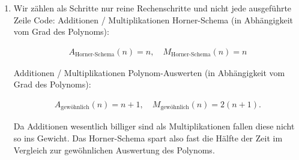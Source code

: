 \begin{solution}
\begin{enumerate}[label = (\roman*)]
  \item Wir zählen als Schritte nur reine Rechenschritte und nicht jede ausgeführte Zeile Code:
  Additionen / Multiplikationen Horner-Schema (in Abhängigkeit vom Grad des Polynoms):
  
  \begin{align*}
    A_{\text{Horner-Schema}}(n) = n,
    \quad
    M_{\text{Horner-Schema}}(n) = n
  \end{align*}

  Additionen / Multiplikationen Polynom-Auswerten (in Abhängigkeit vom Grad des Polynoms):

  \begin{align*}
    A_{\text{gewöhnlich}}(n) = n + 1,
    \quad
    M_{\text{gewöhnlich}}(n) = 2 (n + 1).
  \end{align*}

  Da Additionen wesentlich billiger sind als Multiplikationen fallen diese nicht so ins Gewicht.
  Das Horner-Schema spart also fast die Hälfte der Zeit im Vergleich zur gewöhnlichen Auswertung des Polynoms.

\end{enumerate}

\end{solution}

